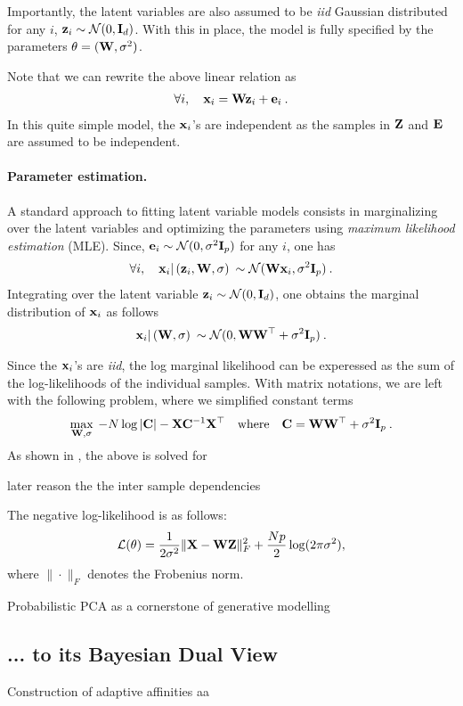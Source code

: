 Importantly, the latent variables are also assumed to be \emph{iid} Gaussian distributed \ie for any $i$, ${\mathbf{z}}_i \sim \mathcal{N}(0, {\mathbf{I}}_d)$. With this in place, the model is fully specified by the parameters $\theta = ({\mathbf{W}}, \sigma^2)$.

Note that we can rewrite the above linear relation as
\begin{align}
    \forall i, \quad {\mathbf{x}}_i = {\mathbf{W}} {\mathbf{z}}_i + {\mathbf{e}}_i \:.
\end{align}
In this quite simple model, the ${\mathbf{x}}_i$'s are independent as the samples in ${\mathbf{Z}}$ and ${\mathbf{E}}$ are assumed to be independent.

\paragraph{Parameter estimation.} A standard approach to fitting latent variable models consists in marginalizing over the latent variables and optimizing the parameters using \emph{maximum likelihood estimation} (MLE).
Since, ${\mathbf{e}}_i \sim \mathcal{N}(0, \sigma^2 {\mathbf{I}}_p)$ for any $i$, one has 
\begin{align}
    \forall i, \quad {\mathbf{x}}_i | \left( {\mathbf{z}}_i, {\mathbf{W}}, \sigma \right) \: \sim \mathcal{N}({\mathbf{W}} {\mathbf{x}}_i, \sigma^2 {\mathbf{I}}_p) \:.
\end{align}
Integrating over the latent variable ${\mathbf{z}}_i \sim \mathcal{N}(0, {\mathbf{I}}_d)$, one obtains the marginal distribution of ${\mathbf{x}}_i$ as follows
\begin{align}
    {\mathbf{x}}_i | \left( {\mathbf{W}}, \sigma \right) \: \sim \mathcal{N}(0, {\mathbf{W}} {\mathbf{W}}^\top + \sigma^2 {\mathbf{I}}_p) \:.
\end{align}

Since the ${\mathbf{x}}_i$'s are \emph{iid}, the log marginal likelihood can be experessed as the sum of the log-likelihoods of the individual samples. With matrix notations, we are left with the following problem, where we simplified constant terms
\begin{align}
    \max_{{\mathbf{W}}, \sigma} \: -N \log |{\mathbf{C}}| - {\mathbf{X}} {\mathbf{C}}^{-1} {\mathbf{X}}^\top \quad \text{where} \quad {\mathbf{C}} = {\mathbf{W}} {\mathbf{W}}^\top + \sigma^2 {\mathbf{I}}_p \:.
\end{align}
As shown in \citep{tipping1999probabilistic}, the above is solved for 

\begin{remark}
    later reason the the inter sample dependencies
\end{remark}

The negative log-likelihood is as follows:
\begin{align}
    \mathcal{L}(\theta) = \frac{1}{2\sigma^2} \| {\mathbf{X}} - {\mathbf{W}} {\mathbf{Z}} \|_F^2 + \frac{Np}{2} \log(2\pi\sigma^2),
\end{align}
where $\| \cdot \|_F$ denotes the Frobenius norm.

\begin{remark}
    Probabilistic PCA as a cornerstone of generative modelling    

    \citep{tomczak2021latent}
\end{remark}

\subsection{... to its Bayesian Dual View}


\citep{lawrence2005probabilistic}


\begin{prob}{Construction of adaptive affinities}
    aa
\end{prob}